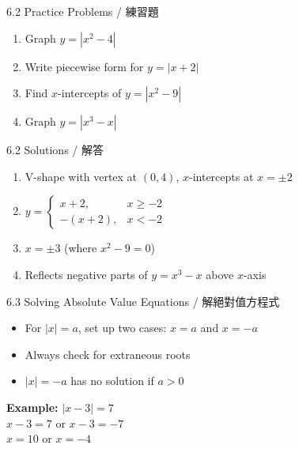 \documentclass[aspectratio=169]{beamer}
\begin{document}
\begin{frame}{6.2 Practice Problems / 練習題}
    \begin{tcolorbox}[colback=lightgray,colframe=accent,title=Practice]
        \footnotesize
        \begin{enumerate}
            \item Graph $y = |x^2 - 4|$
            \item Write piecewise form for $y = |x + 2|$
            \item Find $x$-intercepts of $y = |x^2 - 9|$
            \item Graph $y = |x^3 - x|$
        \end{enumerate}
    \end{tcolorbox}
\end{frame}

\begin{frame}{6.2 Solutions / 解答}
    \begin{tcolorbox}[colback=lightgray,colframe=accent,title=Solutions]
        \footnotesize
        \begin{enumerate}
            \item V-shape with vertex at $(0,4)$, $x$-intercepts at $x = \pm 2$
            \item $y = \begin{cases} x+2, & x \geq -2 \\ -(x+2), & x < -2 \end{cases}$
            \item $x = \pm 3$ (where $x^2 - 9 = 0$)
            \item Reflects negative parts of $y = x^3 - x$ above $x$-axis
        \end{enumerate}
    \end{tcolorbox}
\end{frame}

\begin{frame}{6.3 Solving Absolute Value Equations / 解絕對值方程式}
    \begin{tcolorbox}[colback=lightgray,colframe=primary,title=Key Points]
        \footnotesize
        \begin{itemize}
            \item For $|x| = a$, set up two cases: $x = a$ and $x = -a$
            \item Always check for extraneous roots
            \item $|x| = -a$ has no solution if $a > 0$
        \end{itemize}
    \end{tcolorbox}
    \vspace{0.5em}
    \begin{center}
    \textbf{Example:} $|x-3| = 7$\\
    $x-3 = 7$ or $x-3 = -7$\\
    $x = 10$ or $x = -4$
    \end{center}
\end{frame}
\end{document}
